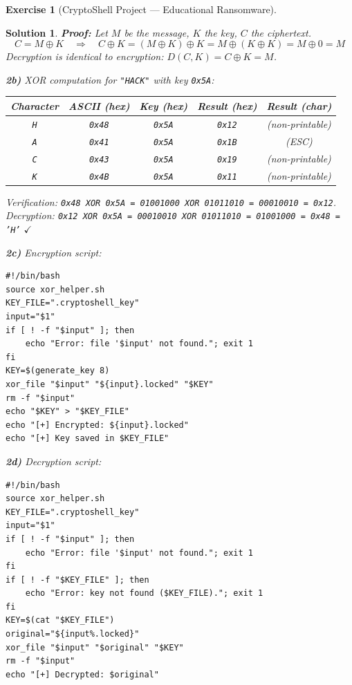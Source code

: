 \documentclass[a4paper,11pt]{article}
\theoremstyle{plain}
\newtheorem{correction}{Solution}
\theoremstyle{definition}
\newtheorem{exercice}{Exercise}
\begin{document}
\begin{exercice}[CryptoShell Project --- Educational Ransomware]
\begin{correction}
\textbf{Proof:} Let $M$ be the message, $K$ the key, $C$ the ciphertext.
\[C = M \oplus K \quad \Rightarrow \quad C \oplus K = (M \oplus K) \oplus K = M \oplus (K \oplus K) = M \oplus 0 = M\]
Decryption is identical to encryption: $D(C, K) = C \oplus K = M$.

\medskip
\textbf{2b)} XOR computation for \texttt{"HACK"} with key \texttt{0x5A}:

\begin{center}
\begin{tabular}{ccccc}
\toprule
\textbf{Character} & \textbf{ASCII (hex)} & \textbf{Key (hex)} & \textbf{Result (hex)} & \textbf{Result (char)} \\
\midrule
\texttt{H} & \texttt{0x48} & \texttt{0x5A} & \texttt{0x12} & (non-printable) \\
\texttt{A} & \texttt{0x41} & \texttt{0x5A} & \texttt{0x1B} & (ESC) \\
\texttt{C} & \texttt{0x43} & \texttt{0x5A} & \texttt{0x19} & (non-printable) \\
\texttt{K} & \texttt{0x4B} & \texttt{0x5A} & \texttt{0x11} & (non-printable) \\
\bottomrule
\end{tabular}
\end{center}

\textit{Verification:} \texttt{0x48 XOR 0x5A = 01001000 XOR 01011010 = 00010010 = 0x12}. \\
\textit{Decryption:} \texttt{0x12 XOR 0x5A = 00010010 XOR 01011010 = 01001000 = 0x48 = 'H'} $\checkmark$

\medskip
\textbf{2c)} Encryption script:
\begin{lstlisting}[title=encrypt.sh]
#!/bin/bash
source xor_helper.sh
KEY_FILE=".cryptoshell_key"
input="$1"
if [ ! -f "$input" ]; then
    echo "Error: file '$input' not found."; exit 1
fi
KEY=$(generate_key 8)
xor_file "$input" "${input}.locked" "$KEY"
rm -f "$input"
echo "$KEY" > "$KEY_FILE"
echo "[+] Encrypted: ${input}.locked"
echo "[+] Key saved in $KEY_FILE"
\end{lstlisting}

\textbf{2d)} Decryption script:
\begin{lstlisting}[title=decrypt.sh]
#!/bin/bash
source xor_helper.sh
KEY_FILE=".cryptoshell_key"
input="$1"
if [ ! -f "$input" ]; then
    echo "Error: file '$input' not found."; exit 1
fi
if [ ! -f "$KEY_FILE" ]; then
    echo "Error: key not found ($KEY_FILE)."; exit 1
fi
KEY=$(cat "$KEY_FILE")
original="${input%.locked}"
xor_file "$input" "$original" "$KEY"
rm -f "$input"
echo "[+] Decrypted: $original"
\end{lstlisting}


\end{correction}
\end{exercice}
\end{document}
